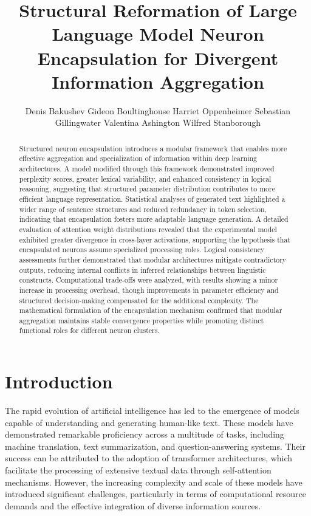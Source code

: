 \documentclass{article}
\title{Structural Reformation of Large Language Model Neuron Encapsulation for Divergent Information Aggregation}
\author{
	Denis Bakushev  \And  Gideon Boultinghouse \And Harriet Oppenheimer \And Sebastian Gillingwater \And Valentina Ashington \And Wilfred Stanborough
}
\begin{document}
\maketitle


\begin{abstract}
Structured neuron encapsulation introduces a modular framework that enables more effective aggregation and specialization of information within deep learning architectures. A model modified through this framework demonstrated improved perplexity scores, greater lexical variability, and enhanced consistency in logical reasoning, suggesting that structured parameter distribution contributes to more efficient language representation. Statistical analyses of generated text highlighted a wider range of sentence structures and reduced redundancy in token selection, indicating that encapsulation fosters more adaptable language generation. A detailed evaluation of attention weight distributions revealed that the experimental model exhibited greater divergence in cross-layer activations, supporting the hypothesis that encapsulated neurons assume specialized processing roles. Logical consistency assessments further demonstrated that modular architectures mitigate contradictory outputs, reducing internal conflicts in inferred relationships between linguistic constructs. Computational trade-offs were analyzed, with results showing a minor increase in processing overhead, though improvements in parameter efficiency and structured decision-making compensated for the additional complexity. The mathematical formulation of the encapsulation mechanism confirmed that modular aggregation maintains stable convergence properties while promoting distinct functional roles for different neuron clusters.

\end{abstract}





\section{Introduction}

The rapid evolution of artificial intelligence has led to the emergence of models capable of understanding and generating human-like text. These models have demonstrated remarkable proficiency across a multitude of tasks, including machine translation, text summarization, and question-answering systems. Their success can be attributed to the adoption of transformer architectures, which facilitate the processing of extensive textual data through self-attention mechanisms. However, the increasing complexity and scale of these models have introduced significant challenges, particularly in terms of computational resource demands and the effective integration of diverse information sources.
\end{document}
